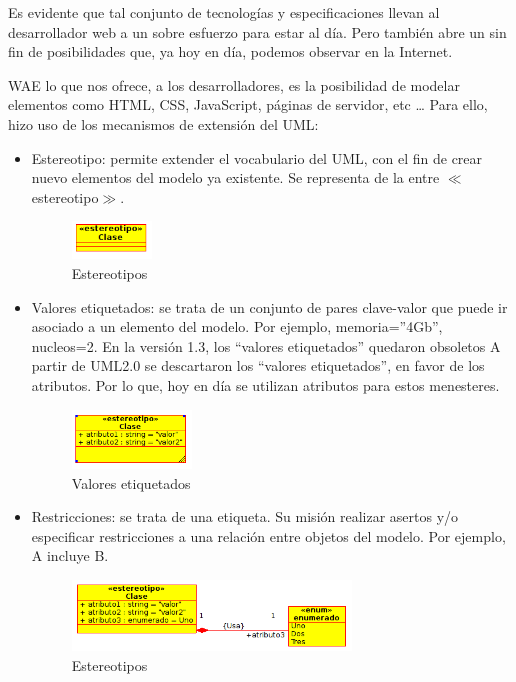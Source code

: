 Es evidente que tal conjunto de tecnologías y especificaciones llevan al desarrollador web a un sobre esfuerzo para estar al día. Pero también abre un sin fin de posibilidades que, ya hoy en día, podemos observar en la Internet.

WAE lo que nos ofrece, a los desarrolladores, es la posibilidad de modelar elementos como HTML, CSS, JavaScript, páginas de servidor, etc … Para ello, hizo uso de los mecanismos de extensión del UML:

\begin{itemize}
\item Estereotipo:  permite extender el vocabulario del UML, con el fin de crear nuevo elementos del modelo ya existente.  Se representa de la entre $\ll$ estereotipo$\gg$.
\begin{figure}[htbp]
\centering
\includegraphics[width=0.2\textwidth]{imagenes/claseestereotipo}
\caption{Estereotipos}
\label{fig:claseestereotipo}
\end{figure}

\item Valores etiquetados: se trata de un conjunto de pares clave-valor que puede ir asociado a un elemento del modelo. Por ejemplo, {memoria=”4Gb”, nucleos=2}. En la versión 1.3, los “valores etiquetados” quedaron obsoletos A partir de UML2.0 se descartaron los “valores etiquetados”, en favor de los atributos. Por lo que, hoy en día se utilizan atributos para estos menesteres.
\begin{figure}[htbp]
\centering
\includegraphics[width=0.3\textwidth]{imagenes/claseetiquetados}
\caption{Valores etiquetados}
\label{fig:claseetiquetados}
\end{figure}

\item Restricciones: se trata de una etiqueta. Su misión realizar asertos y/o especificar restricciones a una relación entre objetos del modelo. Por ejemplo, A {incluye} B.
\begin{figure}[htbp]
\centering
\includegraphics[width=0.7\textwidth]{imagenes/claserestricciones}
\caption{Estereotipos}
\label{fig:claseestereotipos}
\end{figure}

\end{itemize}

